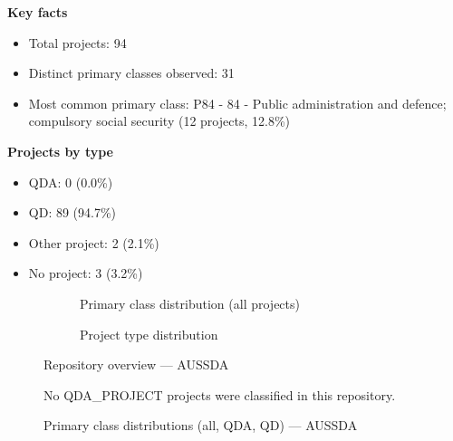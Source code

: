 \textbf{Key facts}

\begin{itemize}
    \item Total projects: 94
    \item Distinct primary classes observed: 31
    \item Most common primary class: P84 - 84 - Public administration and defence; compulsory social security (12 projects, 12.8\%)
\end{itemize}

\textbf{Projects by type}

\begin{itemize}
    \item QDA: 0 (0.0\%)
    \item QD: 89 (94.7\%)
    \item Other project: 2 (2.1\%)
    \item No project: 3 (3.2\%)
\end{itemize}

\begin{figure}[H]
    \centering
    \begin{subfigure}[t]{0.49\textwidth}
        \centering
        
        \caption{Primary class distribution (all projects)}
    \end{subfigure}
    \hfill
    \begin{subfigure}[t]{0.49\textwidth}
        \centering
        
        \caption{Project type distribution}
    \end{subfigure}
    \caption{Repository overview --- AUSSDA}
\end{figure}

\clearpage

\begin{figure}[H]
    \centering
    
    \par\vspace{0.8em}
    No QDA\_PROJECT projects were classified in this repository.
    \par\vspace{0.8em}
    
    \caption{Primary class distributions (all, QDA, QD) --- AUSSDA}
\end{figure}


